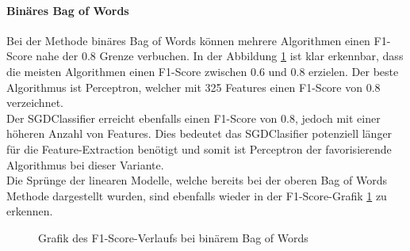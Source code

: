 \paragraph{Binäres Bag of Words}
Bei der Methode \glqq binäres Bag of Words\grqq{} können mehrere Algorithmen einen F1-Score nahe der 0.8 Grenze verbuchen.
In der Abbildung \cref{abb:bow-bin-f1} ist klar erkennbar, dass die meisten Algorithmen einen F1-Score zwischen 0.6 und 0.8 erzielen.
Der beste Algorithmus ist Perceptron, welcher mit 325 Features einen F1-Score von 0.8 verzeichnet.\\
Der SGDClassifier erreicht ebenfalls einen F1-Score von 0.8, jedoch mit einer höheren Anzahl von Features.
Dies bedeutet das SGDClasifier potenziell länger für die Feature-Extraction benötigt und somit ist Perceptron der favorisierende Algorithmus bei dieser Variante.\\
Die Sprünge der linearen Modelle, welche bereits bei der oberen \glqq Bag of Words\grqq{} Methode dargestellt wurden, sind ebenfalls wieder in der F1-Score-Grafik \cref{abb:bow-bin-f1} zu erkennen.
\begin{figure}[H]	
	\setlength{\fboxsep}{0.3pt} 
	\setlength{\fboxrule}{0.3pt} 
	\caption{Grafik des F1-Score-Verlaufs bei binärem Bag of Words}
	\label{abb:bow-bin-f1}
\end{figure}
